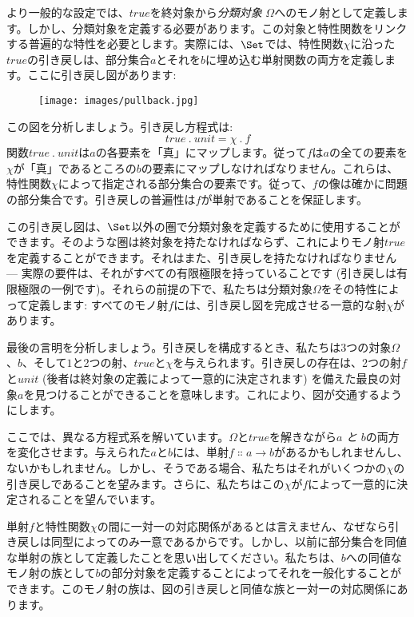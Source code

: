 より一般的な設定では、\(\mathit{true}\)を終対象から\emph{分類対象} \(\Omega\)へのモノ射として定義します。しかし、分類対象を定義する必要があります。この対象と特性関数をリンクする普遍的な特性を必要とします。実際には、\(\Set\)では、特性関数\(\chi\)に沿った\(\mathit{true}\)の引き戻しは、部分集合\(a\)とそれを\(b\)に埋め込む単射関数の両方を定義します。ここに引き戻し図があります: 

\begin{figure}[H]
  \centering
  \texttt{[image: images/pullback.jpg]}
\end{figure}

\noindent
この図を分析しましょう。引き戻し方程式は: 
\[\mathit{true}\ .\ \mathit{unit} = \chi\ .\ f\]
関数\(\mathit{true}\ .\ \mathit{unit}\)は\(a\)の各要素を「真」にマップします。従って\(f\)は\(a\)の全ての要素を\(\chi\)が「真」であるところの\(b\)の要素にマップしなければなりません。これらは、特性関数\(\chi\)によって指定される部分集合の要素です。従って、\(f\)の像は確かに問題の部分集合です。引き戻しの普遍性は\(f\)が単射であることを保証します。

この引き戻し図は、\(\Set\)以外の圏で分類対象を定義するために使用することができます。そのような圏は終対象を持たなければならず、これによりモノ射\(\mathit{true}\)を定義することができます。それはまた、引き戻しを持たなければなりません --- 実際の要件は、それがすべての有限極限を持っていることです (引き戻しは有限極限の一例です)。それらの前提の下で、私たちは分類対象\(\Omega\)をその特性によって定義します: すべてのモノ射\(f\)には、引き戻し図を完成させる一意的な射\(\chi\)があります。

最後の言明を分析しましょう。引き戻しを構成するとき、私たちは3つの対象\(\Omega\)、\(b\)、そして\(1\)と2つの射、\(\mathit{true}\)と\(\chi\)を与えられます。引き戻しの存在は、2つの射\(f\)と\(\mathit{unit}\) (後者は終対象の定義によって一意的に決定されます) を備えた最良の対象\(a\)を見つけることができることを意味します。これにより、図が交通するようにします。

ここでは、異なる方程式系を解いています。\(\Omega\)と\(\mathit{true}\)を解きながら\(a\) \emph{と} \(b\)の両方を変化させます。与えられた\(a\)と\(b\)には、単射\(f \Colon a \to b\)があるかもしれませんし、ないかもしれません。しかし、そうである場合、私たちはそれがいくつかの\(\chi\)の引き戻しであることを望みます。さらに、私たちはこの\(\chi\)が\(f\)によって一意的に決定されることを望んでいます。

単射\(f\)と特性関数\(\chi\)の間に一対一の対応関係があるとは言えません、なぜなら引き戻しは同型によってのみ一意であるからです。しかし、以前に部分集合を同値な単射の族として定義したことを思い出してください。私たちは、\(b\)への同値なモノ射の族として\(b\)の部分対象を定義することによってそれを一般化することができます。このモノ射の族は、図の引き戻しと同値な族と一対一の対応関係にあります。

